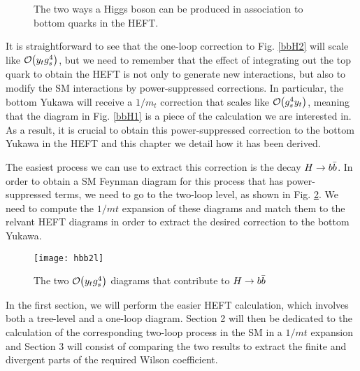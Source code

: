 \begin{figure}[!h]
  \centering
  \hspace{2em}
  \caption[$pp\to H \bbbar$]{The two ways a Higgs boson can be produced in association to bottom quarks in the HEFT.}
  \label{bbHdiags}
\end{figure}

It is straightforward to see that the one-loop correction to Fig. \ref{bbH2} will scale like ${\cal O}\hspace{-0.2em}\left(y_t g_s^4\right)$, but we need to remember that the effect of integrating out the top quark to obtain the HEFT is not only to generate new interactions, but also to modify the SM interactions by power-suppressed corrections. In particular, the bottom Yukawa will receive a $1/m_t$ correction that scales like ${\cal O}\hspace{-0.2em}\left(g_s^4 y_t \right)$, meaning that the diagram in Fig. \ref{bbH1} is a piece of the calculation we are interested in. As a result, it is crucial to obtain this power-suppressed correction to the bottom Yukawa in the HEFT and this chapter we detail how it has been derived.

The easiest process we can use to extract this correction is the decay $H\to \bbbar$. In order to obtain a SM Feynman diagram for this process that has power-suppressed terms, we need to go to the two-loop level, as shown in Fig. \ref{hbb2l}. We need to compute the $1/mt$ expansion of these diagrams and match them to the relvant HEFT diagrams in order to extract the desired correction to the bottom Yukawa.

\begin{figure}[!h]
  \centering
  \texttt{[image: hbb2l]}
  \caption[$H\to \bbbar$ at two loops in the SM]{The two ${\cal O}\hspace{-0.2em}\left(y_t g_s^4\right)$ diagrams that contribute to $H\to \bbbar$}
  \label{hbb2l}
\end{figure}

In the first section, we will perform the easier HEFT calculation, which involves both a tree-level and a one-loop diagram. Section 2 will then be dedicated to the calculation of the corresponding two-loop process in the SM in a $1/mt$ expansion and Section 3 will consist of comparing the two results to extract the finite and divergent parts of the required Wilson coefficient.
